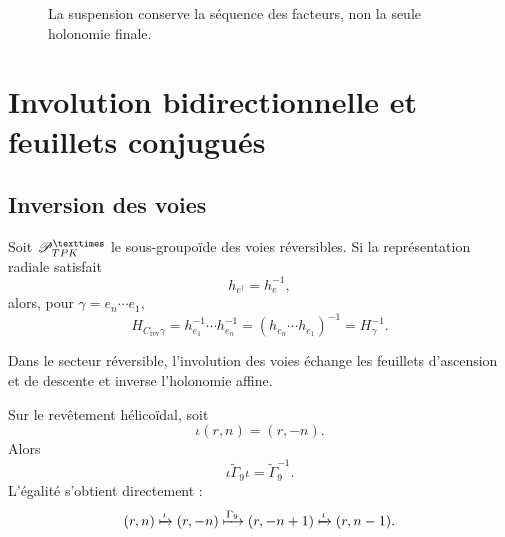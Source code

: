 \begin{figure}[htbp]
\centering
{}
\caption{La suspension conserve la séquence des facteurs, non la seule holonomie finale.}
\label{espiral:fig:skew-ledger}
\end{figure}

\chapter{Involution bidirectionnelle et feuillets conjugués}

\section{Inversion des voies}

Soit \(\mathscr P_{\TPK}^{\times}\) le sous-groupoïde des voies réversibles. Si la représentation radiale satisfait
\[
 h_{e^\dagger}=h_e^{-1},
\]
alors, pour \(\gamma=e_n\cdots e_1\),
\[
 H_{C_{\mathrm{rev}}\gamma}
 =h_{e_1}^{-1}\cdots h_{e_n}^{-1}
 =(h_{e_n}\cdots h_{e_1})^{-1}
 =H_\gamma^{-1}.
\]

\begin{theorem}
Dans le secteur réversible, l'involution des voies échange les feuillets d'ascension et de descente et inverse l'holonomie affine.
\end{theorem}

Sur le revêtement hélicoïdal, soit
\[
 \iota(r,n)=(r,-n).
\]
Alors
\begin{equation}
 \iota\widetilde\Gamma_9\iota
 =\widetilde\Gamma_9^{-1}.
 \label{espiral:eq:involucion-helice}
\end{equation}
L'égalité s'obtient directement :
\[
 (r,n)\xmapsto{\iota}(r,-n)
 \xmapsto{\widetilde\Gamma_9}(r,-n+1)
 \xmapsto{\iota}(r,n-1).
\]

